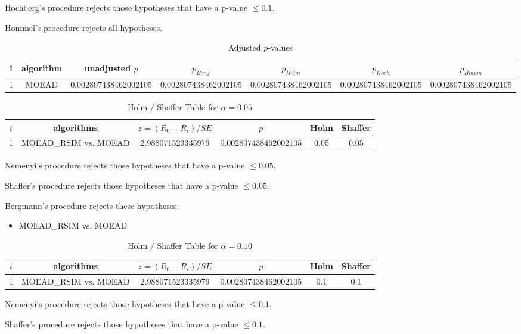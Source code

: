\documentclass[a4paper,10pt]{article}
\begin{document}
\begin{landscape}
Hochberg's procedure rejects those hypotheses that have a p-value $\le0.1$.


Hommel's procedure rejects all hypotheses.


\begin{table}[!htp]
\centering\tiny
\caption{Adjusted $p$-values}
\begin{tabular}{ccccccc}
i&algorithm&unadjusted $p$&$p_{Bonf}$&$p_{Holm}$&$p_{Hoch}$&$p_{Homm}$\\
\hline
1&MOEAD&0.002807438462002105&0.002807438462002105&0.002807438462002105&0.002807438462002105&0.002807438462002105\\
\hline
\end{tabular}
\end{table}

\begin{table}[!htp]
\centering\tiny
\caption{Holm / Shaffer Table for $\alpha=0.05$}
\begin{tabular}{cccccc}
$i$&algorithms&$z=(R_0 - R_i)/SE$&$p$&Holm&Shaffer\\
\hline
1&MOEAD_RSIM vs. MOEAD&2.988071523335979&0.002807438462002105&0.05&0.05\\
\hline
\end{tabular}
\end{table}
Nemenyi's procedure rejects those hypotheses that have a p-value $\le0.05$.


Shaffer's procedure rejects those hypotheses that have a p-value $\le0.05$.


Bergmann's procedure rejects these hypotheses:


\begin{itemize}


\item MOEAD_RSIM vs. MOEAD
\end{itemize}


\begin{table}[!htp]
\centering\tiny
\caption{Holm / Shaffer Table for $\alpha=0.10$}
\begin{tabular}{cccccc}
$i$&algorithms&$z=(R_0 - R_i)/SE$&$p$&Holm&Shaffer\\
\hline
1&MOEAD_RSIM vs. MOEAD&2.988071523335979&0.002807438462002105&0.1&0.1\\
\hline
\end{tabular}
\end{table}
Nemenyi's procedure rejects those hypotheses that have a p-value $\le0.1$.


Shaffer's procedure rejects those hypotheses that have a p-value $\le0.1$.



\end{landscape}
\end{document}
